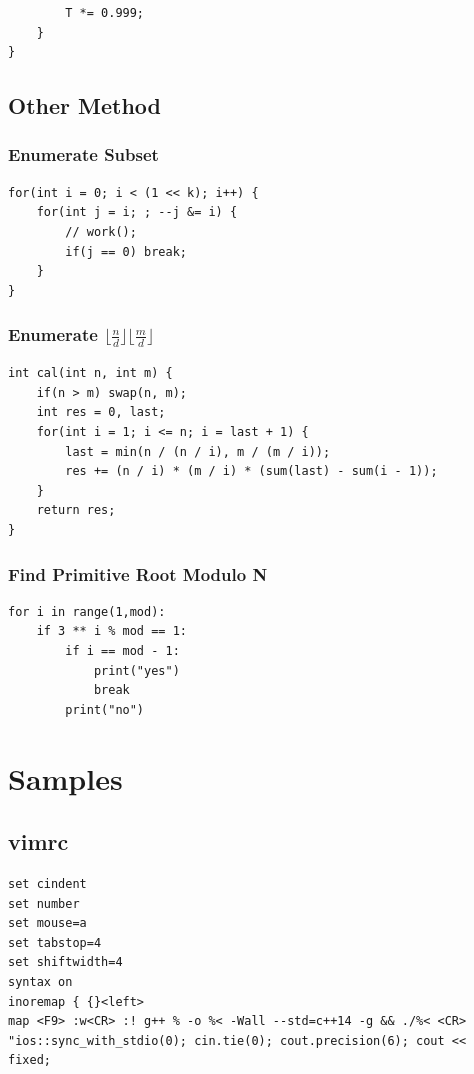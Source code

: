 \documentclass[10pt]{ctexart}
\begin{document}
{{\begin{lstlisting}
        T *= 0.999;
    }
}
\end{lstlisting}
\subsection{Other Method}
\subsubsection{Enumerate Subset}
\begin{lstlisting}
for(int i = 0; i < (1 << k); i++) {
    for(int j = i; ; --j &= i) {
        // work();
        if(j == 0) break;
    }
}
\end{lstlisting}
\subsubsection{Enumerate $\lfloor\frac{n}{d}\rfloor\lfloor\frac{m}{d}\rfloor$}
\begin{lstlisting}
int cal(int n, int m) {
    if(n > m) swap(n, m);
    int res = 0, last;
    for(int i = 1; i <= n; i = last + 1) {
        last = min(n / (n / i), m / (m / i));
        res += (n / i) * (m / i) * (sum(last) - sum(i - 1));
    }
    return res;
}
\end{lstlisting}
\subsubsection{Find Primitive Root Modulo N}
\begin{lstlisting}
for i in range(1,mod):
    if 3 ** i % mod == 1:
        if i == mod - 1:
            print("yes")
            break
        print("no")
\end{lstlisting}






\newpage
\section{Samples}
\subsection{vimrc}
\begin{lstlisting}
set cindent
set number
set mouse=a
set tabstop=4
set shiftwidth=4
syntax on
inoremap { {}<left>
map <F9> :w<CR> :! g++ % -o %< -Wall --std=c++14 -g && ./%< <CR>
"ios::sync_with_stdio(0); cin.tie(0); cout.precision(6); cout << fixed;
\end{lstlisting}

}}
\end{document}
